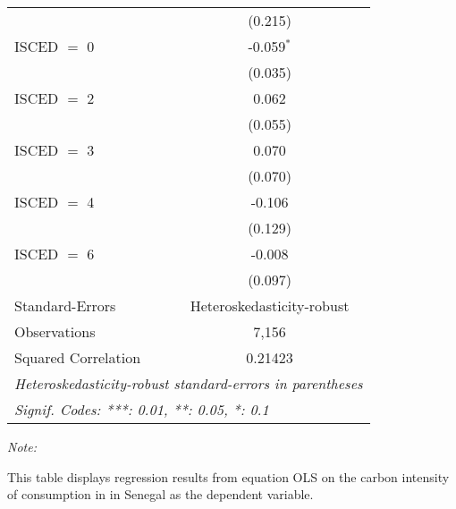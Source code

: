 \begin{table}[htbp!]
\begin{adjustbox}{width = 1\textwidth, max height = 0.95\textheight, center}
\begin{threeparttable}[b]
\begin{tabular}{lc}
                                & (0.215)\\   
            ISCED $=$ 0         & -0.059$^{*}$\\   
                                & (0.035)\\   
            ISCED $=$ 2         & 0.062\\   
                                & (0.055)\\   
            ISCED $=$ 3         & 0.070\\   
                                & (0.070)\\   
            ISCED $=$ 4         & -0.106\\   
                                & (0.129)\\   
            ISCED $=$ 6         & -0.008\\   
                                & (0.097)\\   
            \midrule 
            Standard-Errors     & Heteroskedasticity-robust \\   
            Observations        & 7,156\\  
            Squared Correlation & 0.21423\\  
            \midrule \midrule
            \multicolumn{2}{l}{\emph{Heteroskedasticity-robust standard-errors in parentheses}}\\
            \multicolumn{2}{l}{\emph{Signif. Codes: ***: 0.01, **: 0.05, *: 0.1}}\\
         \end{tabular}
         
         \begin{tablenotes}\item \medskip \textit{Note:}
            \item This table displays regression results from equation OLS on the carbon intensity of consumption in  in Senegal as the dependent variable. 
         \end{tablenotes}
      \end{threeparttable}
   \end{adjustbox}
\end{table}


